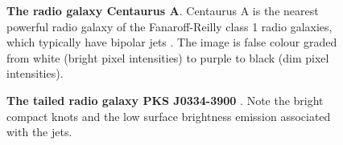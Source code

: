 \begin{figure}
\centering
{}
\caption[Radio galaxy]{\textbf{The radio galaxy Centaurus A}. Centaurus A is the nearest powerful radio galaxy of the Fanaroff-Reilly class 1 radio galaxies, which typically have bipolar jets \cite{feain2011radio}. The image is false colour graded from white (bright pixel intensities) to purple to black (dim pixel intensities).}
\label{fig:centa}
\end{figure}

\begin{figure}
\centering
{}
\caption[Tailed radio galaxy]{\textbf{The tailed radio galaxy PKS J0334-3900} \cite{pratley2013using}. Note the bright compact knots and the low surface brightness emission associated with the jets.}
\label{fig:tailedrg}
\end{figure}

